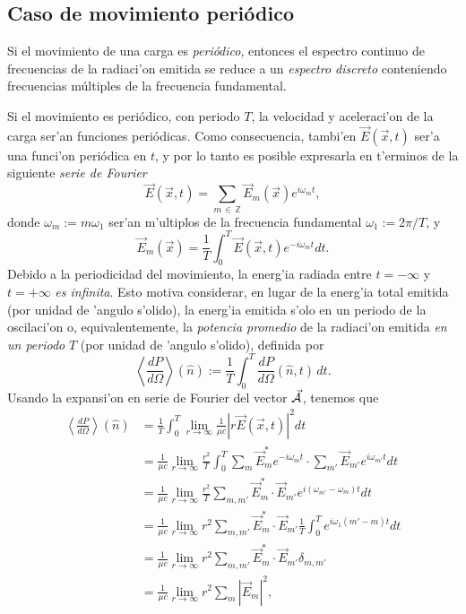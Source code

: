 \subsection{Caso de movimiento periódico}\label{sec:rfp}


Si el movimiento de una carga es \textit{periódico}, entonces el
espectro continuo de frecuencias de la radiaci'on emitida se reduce a un
\textit{espectro discreto} conteniendo frecuencias m\'{u}ltiples de la frecuencia
fundamental.

Si el movimiento es periódico, con periodo $T$, la velocidad y aceleraci'on de la carga ser'an funciones periódicas. Como consecuencia, tambi'en $\vec{E}(\vec{x},t)$ ser'a una funci'on periódica en $t$, y por lo tanto es posible expresarla en t'erminos de la siguiente \textit{serie de Fourier}
\begin{equation}
\vec{E}(\vec{x},t) =\sum_{m\,\in\, \mathbb{Z}} \vec{E}_{m}(\vec{x})e^{i\omega_{m}t},
\end{equation}
donde $\omega_{m}:=m\omega_1$ ser'an m'ultiplos de la frecuencia
fundamental $\omega_1:={2\pi}/{T}$, y
\begin{equation}
\vec{E}_{m}(\vec{x}) =\frac{1}{T}\int_0^{T}\vec{E}(\vec{x},t) e^{-i\omega_{m}t}dt. \label{defAm}
\end{equation}
Debido a la periodicidad del movimiento, la energ'ia radiada entre $t=-\infty$ y $t=+\infty$ \textit{es infinita}. Esto motiva considerar, en lugar de la energ'ia  total emitida (por unidad de 'angulo s'olido), la energ'ia emitida s'olo en un periodo de la oscilaci'on o, equivalentemente, la \textit{potencia promedio} de la radiaci'on emitida \textit{en un periodo} $T$ (por unidad de 'angulo s'olido), definida por
\begin{equation}
\left\langle \frac{dP}{d\Omega}\right\rangle (\hat{n}) :=\frac{1}{T}\int_0^{T}\frac{dP}{d\Omega}(\hat{n},t)\,dt.
\end{equation}
Usando la expansi'on en serie de Fourier del vector $\vec{\cal A}$, tenemos que
\begin{align}
\left\langle \frac{dP}{d\Omega}\right\rangle (\hat{n})&
=\frac{1}{T}\int_0^{T}\lim_{r\to\infty}\frac{1}{\mu c}\left|r \vec{E}(\vec{x},t)\right|^2dt\\
&  =\frac{1}{\mu c}\lim_{r\to\infty}\frac{r^2}{T}\int_0^{T}\sum_{m}\vec{E}_{m}^*e^{-i\omega_{m}t}\cdot\sum_{m'}\vec{E}_{m'}e^{i\omega_{m'}t}dt\\
&  =\frac{1}{\mu c}\lim_{r\to\infty}\frac{r^2}{T}\sum_{m,m' }\vec{E}_{m}^*\cdot\vec{E}_{m'}e^{i\left(\omega_{m'}-\omega_{m}\right)  t}dt\\
&  =\frac{1}{\mu c}\lim_{r\to\infty}r^2 \sum_{m,m'}\vec{E}_{m}^*\cdot\vec{E}_{m'}\frac{1}{T}
\int_0^{T}e^{i\omega_1\left(m'-m\right)  t}dt\\
&  =\frac{1}{\mu c}\lim_{r\to\infty}r^2\sum_{m,m' }\vec{E}_{m}^*\cdot\vec{E}_{m' }\delta_{m,m'}\\
&  =\frac{1}{\mu c}\lim_{r\to\infty}r^2\sum_{m}\left|\vec{E}_{m}\right|^2,
\end{align}
